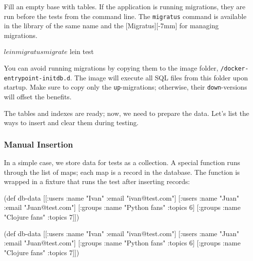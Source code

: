 
Fill an empty base with tables. If the application is running migrations, they are run before the tests from the command line. The \verb|migratus| command is available in the library of the same name and the [Migratus][-7mm] for managing migrations.

\begin{english}
  \begin{clojure}
$ lein migratus migrate
$ lein test
  \end{clojure}
\end{english}

You can avoid running migrations by copying them to the image folder, \texttt{/docker-entry\-point-initdb.d}. The image will execute all SQL files from this folder upon startup. Make sure to copy only the \verb|up|-migrations; otherwise, their \verb|down|-versions will offset the benefits.

The tables and indexes are ready; now, we need to prepare the data. Let's list the ways to insert and clear them during testing.

\subsubsection*{Manual Insertion}

In a simple case, we store data for tests as a collection. A special function runs through the list of maps; each map is a record in the database. The function is wrapped in a fixture that runs the test after inserting records:

\ifx\DEVICETYPE\MOBILE

\begin{english}
  \begin{clojure}
(def db-data
 [[:users {:name "Ivan"
           :email "ivan@test.com"}]
  [:users {:name "Juan"
           :email "Juan@test.com"}]
  [:groups {:name "Python fans"
            :topics 6}]
  [:groups {:name "Clojure fans"
            :topics 7}]])
  \end{clojure}
\end{english}

\else

\begin{english}
  \begin{clojure}
(def db-data
  [[:users {:name "Ivan" :email "ivan@test.com"}]
   [:users {:name "Juan" :email "Juan@test.com"}]
   [:groups {:name "Python fans" :topics 6}]
   [:groups {:name "Clojure fans" :topics 7}]])
  \end{clojure}
\end{english}

